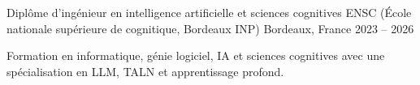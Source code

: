 
\begin{cventries}
  \cventry
    {Diplôme d’ingénieur en intelligence artificielle et sciences cognitives}
    {ENSC (École nationale supérieure de cognitique, Bordeaux INP)}
    {Bordeaux, France}
    {2023 -- 2026}
    {
      \begin{cvitems}
        \item {Formation en informatique, génie logiciel, IA et sciences cognitives avec une spécialisation en LLM, TALN et apprentissage profond.}
      \end{cvitems}
    }
\end{cventries}
